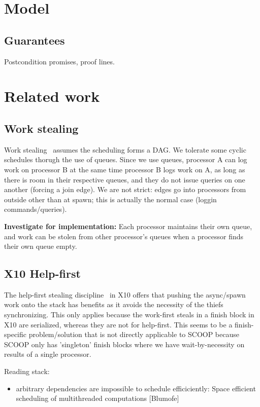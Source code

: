 \documentclass[a4]{article}
\begin{document}
\section{Model}

\subsection{Guarantees}
Postcondition promises, proof lines.

\section{Related work}
\subsection{Work stealing}

Work stealing~\cite{blumofe:1994:scheduling} assumes the scheduling
forms a DAG. 
We tolerate some cyclic schedules thorugh the use of queues.
Since we use queues, processor A can log work on processor B at the 
same time processor B logs work on A, as long as there is room in their
respective queues, and they do not issue queries on one another
(forcing a join edge).
We are not strict: edges go into processors from outside other than at spawn;
this is actually the normal case (loggin commands/queries).

\textbf{Investigate for implementation:}
Each processor maintains their own queue, and work can be stolen from
other processor's queues when a processor finds their own queue empty.

\subsection{X10 Help-first}
The help-first stealing discipline~\cite{guo:2009:work} in X10
offers that pushing the async/spawn work onto the stack has benefits
as it avoids the necessity of the thiefs synchronizing.
This only applies because the work-first steals 
in a finish block in X10 are serialized, 
whereas they are not for help-first.
This seems to be a finish-specific problem/solution
that is not directly applicable to SCOOP because
SCOOP only has 'singleton' finish blocks where we have wait-by-necessity
on results of a single  processor.

Reading stack:

\begin{itemize}
\item arbitrary dependencies are impossible to schedule efficiciently:
  Space efficient scheduling of multithreaded computations [Blumofe]
\end{itemize}
{}

\end{document}
